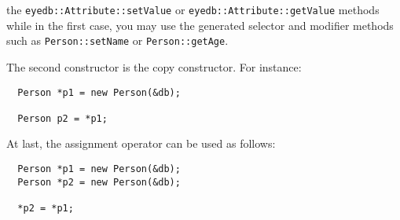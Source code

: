 the \texttt{eyedb::Attribute::setValue} or \texttt{eyedb::Attribute::getValue} methods
while in the first case, you may use the generated selector and modifier
methods such as \texttt{Person::setName} or \texttt{Person::getAge}.
\item The second constructor is the copy constructor. For instance:
\verbsize
\begin{verbatim}
  Person *p1 = new Person(&db);

  Person p2 = *p1;
\end{verbatim}
\normalsize
\item At last, the assignment operator can be used as follows:
\verbsize
\begin{verbatim}
  Person *p1 = new Person(&db);
  Person *p2 = new Person(&db);

  *p2 = *p1;
\end{verbatim}
\normalsize
\ei


